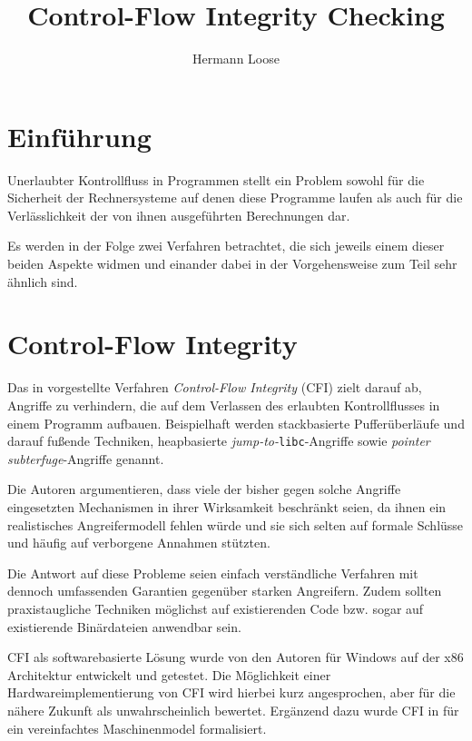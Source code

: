 \documentclass[11pt]{article}
\title{Control-Flow Integrity Checking}
\author{Hermann Loose}
\begin{document}
\maketitle

\section{Einführung}

Unerlaubter Kontrollfluss in Programmen stellt ein Problem sowohl für die
Sicherheit der Rechnersysteme auf denen diese Programme laufen als auch für die
Verlässlichkeit der von ihnen ausgeführten Berechnungen dar.

Es werden in der Folge zwei Verfahren betrachtet, die sich jeweils einem dieser
beiden Aspekte widmen und einander dabei in der Vorgehensweise zum Teil sehr
ähnlich sind.

\section{Control-Flow Integrity}

Das in \cite{abadi-2005-control-msr} vorgestellte Verfahren \emph{Control-Flow
Integrity} (CFI) zielt darauf ab, Angriffe zu verhindern, die auf dem Verlassen
des erlaubten Kontrollflusses in einem Programm aufbauen. Beispielhaft werden
stackbasierte Pufferüberläufe und darauf fußende Techniken, heapbasierte
\emph{jump-to-}\texttt{libc}-Angriffe sowie \emph{pointer subterfuge}-Angriffe
genannt.

Die Autoren argumentieren, dass viele der bisher gegen solche Angriffe
eingesetzten Mechanismen in ihrer Wirksamkeit beschränkt seien, da ihnen ein
realistisches Angreifermodell fehlen würde und sie sich selten auf formale
Schlüsse und häufig auf verborgene Annahmen stützten.

Die Antwort auf diese Probleme seien einfach verständliche Verfahren mit
dennoch umfassenden Garantien gegenüber starken Angreifern. Zudem sollten
praxistaugliche Techniken möglichst auf existierenden Code bzw. sogar auf
existierende Binärdateien anwendbar sein.

CFI als softwarebasierte Lösung wurde von den Autoren für Windows auf der x86
Architektur entwickelt und getestet. Die Möglichkeit einer
Hardwareimplementierung von CFI wird hierbei kurz angesprochen, aber für die
nähere Zukunft als unwahrscheinlich bewertet. Ergänzend dazu wurde CFI in
\cite{abadi-2005-theory-fmse} für ein vereinfachtes Maschinenmodel
formalisiert.
\end{document}
